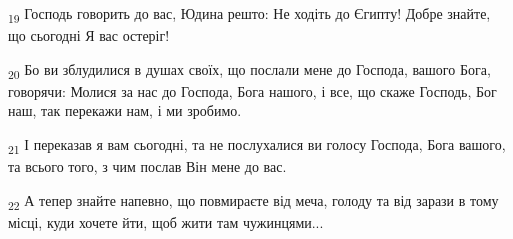 \begin{tcolorbox}
\textsubscript{19} Господь говорить до вас, Юдина решто: Не ходіть до Єгипту! Добре знайте, що сьогодні Я вас остеріг!
\end{tcolorbox}
\begin{tcolorbox}
\textsubscript{20} Бо ви зблудилися в душах своїх, що послали мене до Господа, вашого Бога, говорячи: Молися за нас до Господа, Бога нашого, і все, що скаже Господь, Бог наш, так перекажи нам, і ми зробимо.
\end{tcolorbox}
\begin{tcolorbox}
\textsubscript{21} І переказав я вам сьогодні, та не послухалися ви голосу Господа, Бога вашого, та всього того, з чим послав Він мене до вас.
\end{tcolorbox}
\begin{tcolorbox}
\textsubscript{22} А тепер знайте напевно, що повмираєте від меча, голоду та від зарази в тому місці, куди хочете йти, щоб жити там чужинцями...
\end{tcolorbox}
